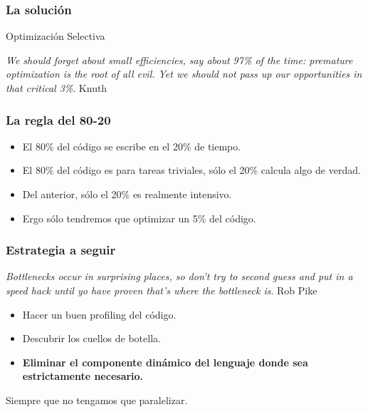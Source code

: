 \documentclass{beamer}
\begin{document}
\begin{frame}
  \frametitle{La solución}
  \begin{center}
    \begin{Huge}
      Optimización Selectiva
    \end{Huge}
  \end{center}
  \vspace{1cm}
  \begin{flushright}
    \textit{We should forget about small efficiencies, say about 97\%
      of the time: premature optimization is the root of all evil. Yet
      we should not pass up our opportunities in that critical 3\%}. Knuth
  \end{flushright}
\end{frame}

\begin{frame}
  \frametitle{La regla del 80-20}
  \begin{itemize}
  \item El 80\% del código se escribe en el 20\% de tiempo.
  \item El 80\% del código es para tareas triviales, sólo el 20\%
    calcula algo de verdad.
  \item Del anterior, sólo el 20\% es realmente intensivo.
  \item Ergo sólo tendremos que optimizar un 5\% del código.
  \end{itemize}
\end{frame}

\begin{frame}
  \frametitle{Estrategia a seguir}
  \begin{flushright}
    \textit{Bottlenecks occur in surprising places, so don't try to
      second guess and put in a speed hack until yo have proven that's
      where the bottleneck is}. Rob Pike
  \end{flushright}
  \vspace{1cm}
  \begin{itemize}
  \item Hacer un buen profiling del código.
  \item Descubrir los cuellos de botella.
  \item \textbf{Eliminar el componente dinámico del lenguaje donde sea
    estrictamente necesario.}
  \end{itemize}
\end{frame}

\begin{frame}
  \begin{center}
    \begin{Huge}
      Siempre que no tengamos que paralelizar.
    \end{Huge}
  \end{center}
\end{frame}
\end{document}
